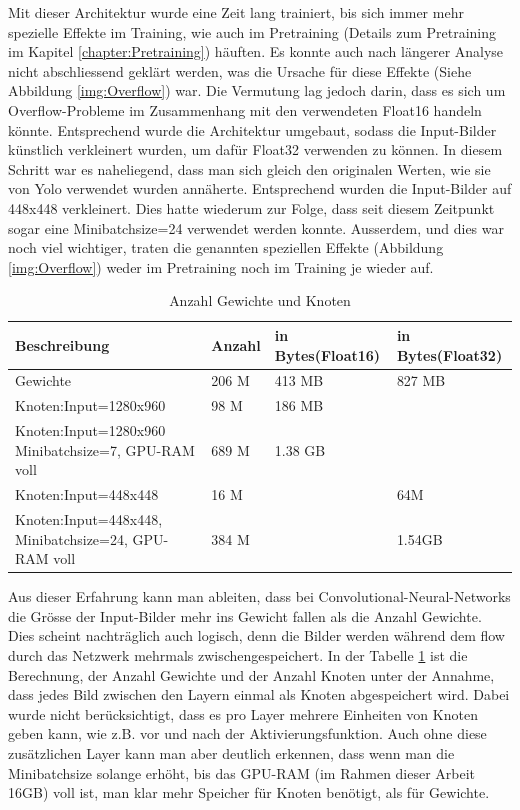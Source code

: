 Mit dieser Architektur wurde eine Zeit lang trainiert, bis sich immer mehr spezielle Effekte im Training, wie auch im Pretraining (Details zum Pretraining im Kapitel \ref{chapter:Pretraining}) häuften.
Es konnte auch nach längerer Analyse nicht abschliessend geklärt werden, was die Ursache für diese Effekte (Siehe Abbildung \ref{img:Overflow}) war.
Die Vermutung lag jedoch darin, dass es sich um Overflow-Probleme im Zusammenhang mit den verwendeten Float16 handeln könnte.
Entsprechend wurde die Architektur umgebaut, sodass die Input-Bilder künstlich verkleinert wurden, um dafür Float32 verwenden zu können.
In diesem Schritt war es naheliegend, dass man sich gleich den originalen Werten, wie sie von Yolo \cite{yolo} verwendet wurden annäherte.
Entsprechend wurden die Input-Bilder auf 448x448 verkleinert.
Dies hatte wiederum zur Folge, dass seit diesem Zeitpunkt sogar eine Minibatchsize=24 verwendet werden konnte.
Ausserdem, und dies war noch viel wichtiger, traten die genannten speziellen Effekte (Abbildung \ref{img:Overflow}) weder im Pretraining noch im Training je wieder auf. 

\begin{table}
\centering
\begin{tabularx}{\textwidth}{|X|l|l|l|}
\hline  Beschreibung & Anzahl & in Bytes(Float16) & in Bytes(Float32)\\
\hline  Gewichte											& 206 M 	& 413 MB 	& 827 MB		\\
\hline  Knoten:Input=1280x960 							&  98 M 	& 186 MB 	&			\\
\hline  Knoten:Input=1280x960 Minibatchsize=7, GPU-RAM voll	& 689 M 	& 1.38 GB 	& 			\\
\hline  Knoten:Input=448x448 							&  16 M 	& 			& 64M 		\\
\hline  Knoten:Input=448x448, Minibatchsize=24, GPU-RAM voll	& 384 M 	& 			& 1.54GB 	\\
\hline
\end{tabularx}
\caption{Anzahl Gewichte und Knoten}
\label{tbl:anzahl_gewichte_knoten}
\end{table} 

Aus dieser Erfahrung kann man ableiten, dass bei Convolutional-Neural-Networks die Grösse der Input-Bilder mehr ins Gewicht fallen als die Anzahl Gewichte. 
Dies scheint nachträglich auch logisch, denn die Bilder werden während dem \grqq{}flow\grqq{} durch das Netzwerk mehrmals zwischengespeichert.
In der Tabelle \ref{tbl:anzahl_gewichte_knoten} ist die Berechnung, der Anzahl Gewichte und der Anzahl Knoten unter der Annahme, dass jedes Bild zwischen den Layern einmal als Knoten abgespeichert wird.
Dabei wurde nicht berücksichtigt, dass es pro Layer mehrere Einheiten von Knoten geben kann, wie z.B. vor und nach der Aktivierungsfunktion. 
Auch ohne diese zusätzlichen Layer kann man aber deutlich erkennen, dass wenn man die Minibatchsize solange erhöht, bis das GPU-RAM (im Rahmen dieser Arbeit 16GB) voll ist, man klar mehr Speicher für Knoten benötigt, als für Gewichte.

